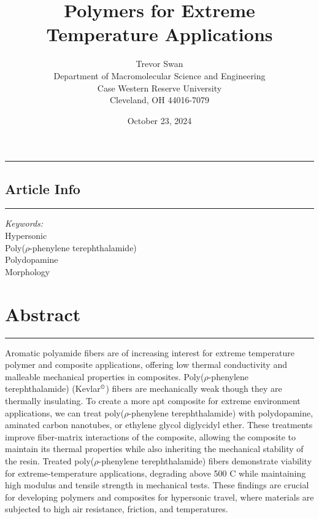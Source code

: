 \documentclass[12pt]{article}
\title{\textbf{Polymers for Extreme Temperature Applications}}
\author{Trevor Swan \\
Department of Macromolecular Science and Engineering \\ 
Case Western Reserve University \\
Cleveland, OH 44016-7079}
\date{October 23, 2024}
\begin{document}
\maketitle

\hrule height 1pt
\vspace{1em}

\noindent
\begin{minipage}[t]{0.2\textwidth}
    \subsection*{Article Info}
    \vspace{-0.5em}
    \hrule height 1pt
    \vspace{0.5em}
    \textit{Keywords:}\\
    	Hypersonic\\
        Poly($\rho$-phenylene terephthalamide)\\
        Polydopamine\\
    	Morphology
\end{minipage}%
\hfill
\begin{minipage}[t]{0.75\textwidth}
    \section*{Abstract}
    \vspace{-0.97em}
    \hrule height 1pt
    \vspace{0.5em}
    Aromatic polyamide fibers are of increasing interest for extreme temperature polymer and composite applications, offering  low thermal conductivity and malleable mechanical properties in composites. Poly($\rho$-phenylene terephthalamide) (Kevlar$^{\text{\textcopyright}}$) fibers are mechanically weak though they are thermally insulating. To create a more apt composite for extreme environment applications, we can treat poly($\rho$-phenylene terephthalamide) with polydopamine, aminated carbon nanotubes, or ethylene glycol diglycidyl ether. These treatments improve fiber-matrix interactions of the composite, allowing the composite to maintain its thermal properties while also inheriting the mechanical stability of the resin. Treated poly($\rho$-phenylene terephthalamide) fibers demonstrate viability for extreme-temperature applications, degrading above 500 \degree C while maintaining high modulus and tensile strength in mechanical tests. These findings are crucial for developing polymers and composites for hypersonic travel, where materials are subjected to high air resistance, friction, and temperatures.
    
\end{minipage}
\end{document}

